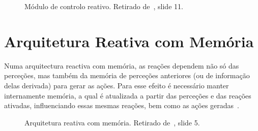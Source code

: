 \begin{figure}[H]
    \begin{center}
    \end{center}
    \caption{Módulo de controlo reativo.
    Retirado de~\cite{isel:iasa:slides:arq-agentes-reativos-parte-2}, slide 11.}\label{fig:controle-reativo}
\end{figure}


\section{Arquitetura Reativa com Memória}\label{sec:arquiteturas-reativa-memoria}

Numa arquitectura reactiva com memória, as reações dependem não só das perceções, mas
também da memória de perceções anteriores (ou de informação delas derivada) para gerar as
ações. Para esse efeito é necessário manter internamente memória, a qual é atualizada a partir das
perceções e das reações ativadas, influenciando essas mesmas reações, bem como as ações
geradas~\cite{isel:iasa:slides:arq-agentes-reativos-parte-3}.

\begin{figure}[H]
    \begin{center}
    \end{center}
    \caption{Arquitetura reativa com memória.
    Retirado de~\cite{isel:iasa:slides:arq-agentes-reativos-parte-3}, slide 5.}\label{fig:arquitetura-reativa-memoria}
\end{figure}

